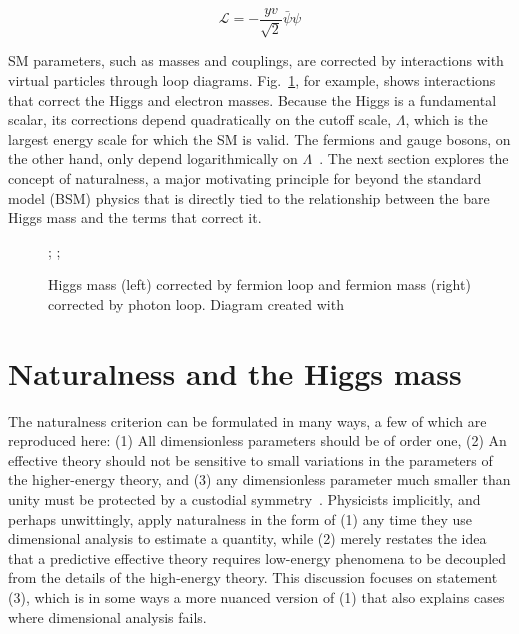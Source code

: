 \documentclass[12pt]{article}
\begin{document}
    \noindent \begin{equation}
        \mathcal{L} = -\frac{yv}{\sqrt{2}}\bar{\psi}\psi 
        \label{yukawa_terms}
    \end{equation}

    SM parameters, such as masses and couplings, are corrected by interactions with virtual particles through loop diagrams. Fig.~\ref{loop_diagrams}, for example, shows interactions that correct the Higgs and electron masses. Because the Higgs is a fundamental scalar, its corrections depend quadratically on the cutoff scale, $\Lambda$, which is the largest energy scale for which the SM is valid. The fermions and gauge bosons, on the other hand, only depend logarithmically on $\Lambda$~\cite{dine_naturalness}. The next section explores the concept of naturalness, a major motivating principle for beyond the standard model (BSM) physics that is directly tied to the relationship between the bare Higgs mass and the terms that correct it.


    \noindent \begin{figure}[htbp] \begin{center}
        ;
        \qquad
        ;
        \caption{Higgs mass (left) corrected by fermion loop and fermion mass (right) corrected by photon loop. Diagram created with~\cite{tikz}}
        \label{loop_diagrams}
    \end{center} \end{figure}

\section{Naturalness and the Higgs mass}
    The naturalness criterion can be formulated in many ways, a few of which are reproduced here: (1) All dimensionless parameters should be of order one, (2) An effective theory should not be sensitive to small variations in the parameters of the higher-energy theory, and (3) any dimensionless parameter much smaller than unity must be protected by a custodial symmetry~\cite{giudice_naturally, thooft_naturalness}. Physicists implicitly, and perhaps unwittingly, apply naturalness in the form of (1) any time they use dimensional analysis to estimate a quantity, while (2) merely restates the idea that a predictive effective theory requires low-energy phenomena to be decoupled from the details of the high-energy theory. This discussion focuses on statement (3), which is in some ways a more nuanced version of (1) that also explains cases where dimensional analysis fails.
\end{document}
